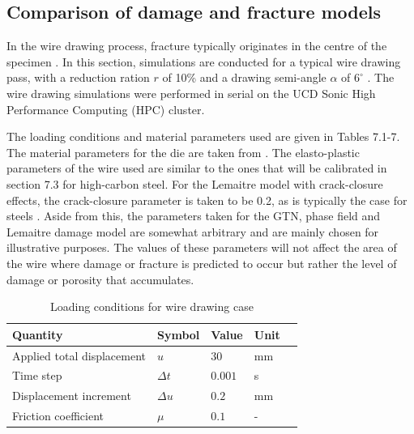 \documentclass[sn-mathphys,Numbered,draft]{sn-jnl}%
\begin{document}
\FloatBarrier

\subsection{Comparison of damage and fracture models}

In the wire drawing process, fracture typically originates in the centre of the specimen \cite{gonzalez_assessment_2018,norasethasopon_prediction_2008,hoffmanner_selection_1971,choi_study_2010}. In this section, simulations are conducted for a typical wire drawing pass, with a reduction ration $r$ of 10\% and a drawing semi-angle $\alpha$ of $6^{\circ}$ \cite{roh_process_2021}. The wire drawing simulations were performed in serial on the UCD Sonic High Performance Computing (HPC) cluster.

The loading conditions and material parameters used are given in Tables 7.1-7. The material parameters for the die are taken from \citet{clancy_improving_2019}. The elasto-plastic parameters of the wire used are similar to the ones that will be calibrated in section 7.3 for high-carbon steel. For the Lemaitre model with crack-closure effects, the crack-closure parameter is taken to be 0.2, as is typically the case for steels \cite{desmorat_modeling_2008,lemaitre_course_1996,bouchard_enhanced_2011}. Aside from this, the parameters taken for the GTN, phase field and Lemaitre damage model are somewhat arbitrary and are mainly chosen for illustrative purposes. The values of these parameters will not affect the area of the wire where damage or fracture is predicted to occur but rather the level of damage or porosity that accumulates.

\begin{table}[htb]
	\centering
		\begin{tabular}{lllll} \hline
		    Quantity & Symbol & Value & Unit \\
		    \hline
		    Applied total displacement & $u$ & $30$ & mm \\
		    Time step & $\Delta t$ & $0.001$ & s \\
			Displacement increment  & $\Delta u$ & $0.2$ & mm   \\
			Friction coefficient & $\mu$ & $0.1$ & - \\
			\hline
		\end{tabular}
	\caption{Loading conditions for wire drawing case}
	\label{tab:material_properties}
\end{table}
\end{document}
